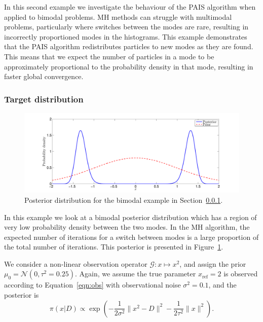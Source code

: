 \documentclass[final]{siamltex}
\newcommand{\G}{\mathcal{G}}
\newcommand{\N}{\mathcal{N}}
\begin{document}
In this second example we investigate the behaviour of the PAIS
algorithm when applied to bimodal problems. MH methods can struggle
with multimodal problems, particularly where switches between the
modes are rare, resulting in incorrectly proportioned modes in the
histograms. This example demonstrates that the PAIS algorithm
redistributes particles to new modes as they are found. This means
that we expect the number of particles in a mode to be approximately
proportional to the probability density in that mode, resulting in
faster global convergence.


\subsubsection{Target distribution} \label{sec:tar}

\begin{figure}[htpb]
\begin{center}
\includegraphics[width=\textwidth]{"figures/BM2_posterior"}
\caption{Posterior distribution for the bimodal example in
Section~\ref{sec:tar}.}
\label{fig:BM2_posterior}
\end{center}
\end{figure}

In this example we look at a bimodal posterior distribution which has
a region of very low probability density between the two modes. In the MH algorithm, the
expected number of iterations for a switch between modes is a large
proportion of the total number of iterations. This posterior is presented in
Figure~\ref{fig:BM2_posterior}.

We consider a non-linear observation operator $\G\colon x \mapsto
x^2$, and assign the prior $\mu_0 = \N(0, \tau^2=0.25)$. Again, we
assume the true parameter $x_\text{ref}=2$ is observed according to
Equation~\eqref{eqn:obs} with observational noise $\sigma^2 = 0.1$,
and the posterior is
\[
	\pi(x|D) \propto \exp\left(-\frac{1}{2\sigma^2}\|x^2 - D\|^2
		 - \frac{1}{2\tau^2}\|x\|^2\right).
\]
\end{document}
